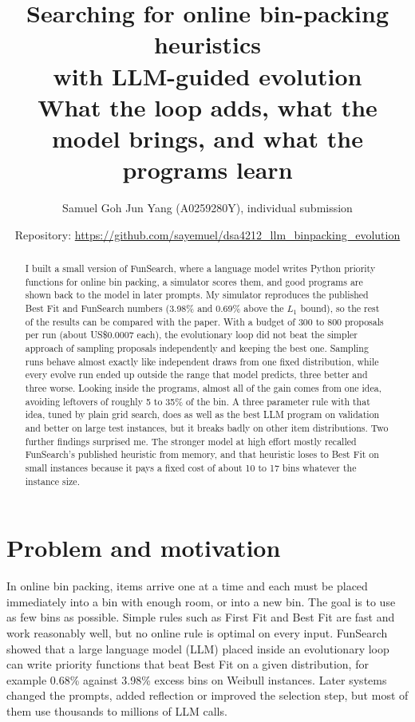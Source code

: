 \documentclass[10pt]{article}
\title{Searching for online bin-packing heuristics\\ with LLM-guided evolution\\[4pt]
\large What the loop adds, what the model brings, and what the programs learn}
\author{Samuel Goh Jun Yang (A0259280Y), individual submission}
\date{Repository: \url{https://github.com/sayemuel/dsa4212_llm_binpacking_evolution}}
\begin{document}
\maketitle

\begin{abstract}
I built a small version of FunSearch, where a language model writes Python priority functions for
online bin packing, a simulator scores them, and good programs are shown back to the model in later
prompts. My simulator reproduces the published Best Fit and FunSearch numbers (3.98\% and 0.69\%
above the $L_1$ bound), so the rest of the results can be compared with the paper. With a budget of
300 to 800 proposals per run (about US\$0.0007 each), the evolutionary loop did not beat the simpler
approach of sampling proposals independently and keeping the best one. Sampling runs behave almost
exactly like independent draws from one fixed distribution, while every evolve run ended up outside
the range that model predicts, three better and three worse. Looking inside the programs, almost all
of the gain comes from one idea, avoiding leftovers of roughly 5 to 35\% of the bin. A three
parameter rule with that idea, tuned by plain grid search, does as well as the best LLM program on
validation and better on large test instances, but it breaks badly on other item distributions. Two
further findings surprised me. The stronger model at high effort mostly recalled FunSearch's
published heuristic from memory, and that heuristic loses to Best Fit on small instances because it
pays a fixed cost of about 10 to 17 bins whatever the instance size.
\end{abstract}

\section{Problem and motivation}
In online bin packing, items arrive one at a time and each must be placed immediately into a bin
with enough room, or into a new bin. The goal is to use as few bins as possible. Simple rules such as
First Fit and Best Fit \cite{johnson1973near,coffman2013binpacking} are fast and work reasonably well,
but no online rule is optimal on every input. FunSearch \cite{romera2024funsearch} showed that a
large language model (LLM) placed inside an evolutionary loop can write priority functions that beat
Best Fit on a given distribution, for example 0.68\% against 3.98\% excess bins on Weibull instances.
Later systems \cite{liu2024eoh,ye2024reevo,novikov2025alphaevolve,lange2025shinka} changed the
prompts, added reflection or improved the selection step, but most of them use thousands to millions
of LLM calls.
\end{document}
